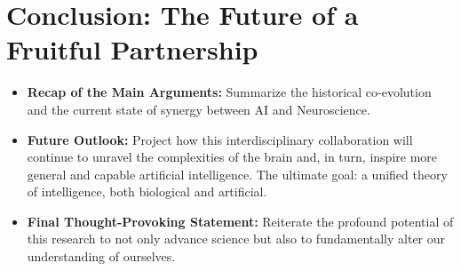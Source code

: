 \documentclass[11pt,a4paper]{article}
\begin{document}
\section{Conclusion: The Future of a Fruitful Partnership}
\begin{itemize}
    \item \textbf{Recap of the Main Arguments:} Summarize the historical co-evolution and the current state of synergy between AI and Neuroscience.
    \item \textbf{Future Outlook:} Project how this interdisciplinary collaboration will continue to unravel the complexities of the brain and, in turn, inspire more general and capable artificial intelligence. The ultimate goal: a unified theory of intelligence, both biological and artificial.
    \item \textbf{Final Thought-Provoking Statement:} Reiterate the profound potential of this research to not only advance science but also to fundamentally alter our understanding of ourselves.
\end{itemize}

\clearpage
\nocite{*}
\printbibliography%
\end{document}
